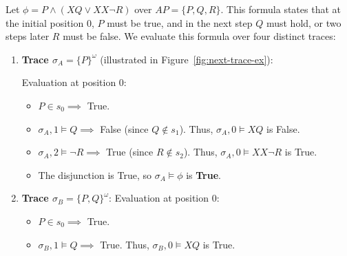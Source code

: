 \begin{example}
Let $\phi = P \land (X Q \lor X X \neg R)$ over $AP = \{P, Q, R\}$. This formula states that at the initial position 0, $P$ must be true, and in the next step $Q$ must hold, or two steps later $R$ must be false.
We evaluate this formula over four distinct traces:
\begin{enumerate}
    \item \textbf{Trace $\sigma_A = \{P\}^\omega$} (illustrated in Figure~\ref{fig:next-trace-ex}):
          \begin{center}
            \label{fig:next-trace-ex}
          \end{center}
          Evaluation at position 0:
          \begin{itemize}
              \item $P \in s_0 \implies$ True.
              \item $\sigma_A, 1 \models Q \implies$ False (since $Q \notin s_1$). Thus, $\sigma_A, 0 \models X Q$ is False.
              \item $\sigma_A, 2 \models \neg R \implies$ True (since $R \notin s_2$). Thus, $\sigma_A, 0 \models X X \neg R$ is True.
              \item The disjunction is True, so $\sigma_A \models \phi$ is \textbf{True}.
          \end{itemize}
    \item \textbf{Trace $\sigma_B = \{P, Q\}^\omega$}:
          Evaluation at position 0:
          \begin{itemize}
              \item $P \in s_0 \implies$ True.
              \item $\sigma_B, 1 \models Q \implies$ True. Thus, $\sigma_B, 0 \models X Q$ is True.

\end{itemize}
\end{enumerate}
\end{example}
